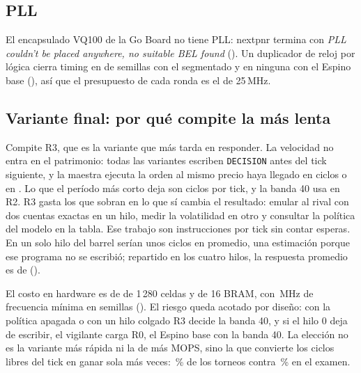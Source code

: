 \subsection{PLL}

El encapsulado VQ100 de la Go Board no tiene PLL: nextpnr termina con \emph{PLL couldn't be placed anywhere, no suitable BEL found} (). Un duplicador de reloj por lógica cierra timing en \pSieteDobleSemillas{} de \pSieteDobleSemillasTotal{} semillas con el segmentado y en ninguna con el Espino base (), así que el presupuesto de cada ronda es el de 25\,MHz.

\subsection{Variante final: por qué compite la más lenta}

Compite R3, que es la variante que más tarda en responder. La velocidad no entra en el patrimonio: todas las variantes escriben \texttt{DECISION} antes del tick siguiente, y la maestra ejecuta la orden al mismo precio haya llegado en \ctresSegRespPeor{} ciclos o en \ctresRespPeor. Lo que el período más corto deja son \ctresPresupuesto{} ciclos por tick, y la banda 40 usa \ctresRdosRespPeor{} en R2. R3 gasta los que sobran en lo que sí cambia el resultado: emular al rival con dos cuentas exactas en un hilo, medir la volatilidad en otro y consultar la política del modelo en la tabla. Ese trabajo son \ctresTrabajoSerie{} instrucciones por tick sin contar esperas. En un solo hilo del barrel serían unos \ctresTrabajoSerieCiclos{} ciclos en promedio, una estimación porque ese programa no se escribió; repartido en los cuatro hilos, la respuesta promedio es de \ctresRespProm{} ().

El costo en hardware es de \ctresCeldas{} de 1\,280 celdas y \ctresBram{} de 16 BRAM, con \ctresFmin\,MHz de frecuencia mínima en \ctresSemillas{} semillas (). El riesgo queda acotado por diseño: con la política apagada o con un hilo colgado R3 decide la banda 40, y si el hilo 0 deja de escribir, el vigilante carga R0, el Espino base con la banda 40. La elección no es la variante más rápida ni la de más MOPS, sino la que convierte los ciclos libres del tick en ganar sola más veces: \ctresExamenGana\,\% de los torneos contra \ctresExamenGanaBanda\,\% en el examen.
